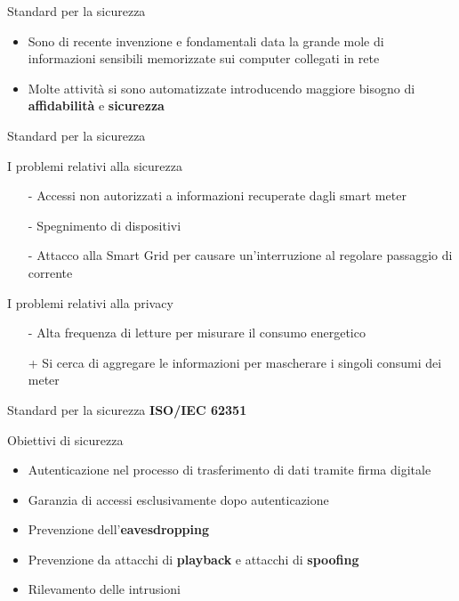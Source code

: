 \begin{frame}{Standard per la sicurezza}
	\begin{itemize}[<+- | alert@+>]
		\item Sono di recente invenzione e fondamentali data la grande mole di informazioni sensibili memorizzate sui computer collegati in rete
		\item Molte attività si sono automatizzate introducendo maggiore bisogno di \textbf{\color{blue_slides}affidabilità} e \textbf{\color{blue_slides}sicurezza}
	\end{itemize}
\end{frame}

\begin{frame}{Standard per la sicurezza}
	\begin{block}{I problemi relativi alla sicurezza}
	\begin{itemize}
		\item[-] Accessi non autorizzati a informazioni recuperate dagli smart meter
		\item[-] Spegnimento di dispositivi
		\item[-] Attacco alla Smart Grid per causare un'interruzione al regolare passaggio di corrente
	\end{itemize}
	\end{block}		
	\pause
	\begin{block}{I problemi relativi alla privacy}
	\begin{itemize}
		\item[-] Alta frequenza di letture per misurare il consumo energetico
		\item[+] Si cerca di aggregare le informazioni per mascherare i singoli consumi dei meter
	\end{itemize}
	\end{block}		
\end{frame}

\begin{frame}{Standard per la sicurezza}
\textbf{ISO/IEC 62351}
\begin{block}{Obiettivi di sicurezza}
\begin{itemize}[<+- | alert@+>]
	\item Autenticazione nel processo di trasferimento di dati tramite firma digitale
	\item Garanzia di accessi esclusivamente dopo autenticazione
	\item Prevenzione dell'\textbf{\color{blue_slides}eavesdropping}
	\item Prevenzione da attacchi di \textbf{\color{blue_slides}playback} e attacchi di \textbf{\color{blue_slides}spoofing}
	\item Rilevamento delle intrusioni
\end{itemize}
\end{block}
\end{frame}

